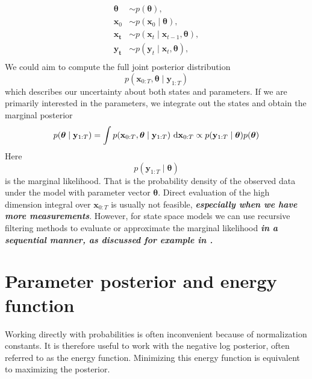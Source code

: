 \begin{align*}
    \boldsymbol{\theta} &\sim p(\boldsymbol{\theta}), \\
    \mathbf{x}_0 &\sim p(\mathbf{x}_0 \mid \boldsymbol{\theta}),\\
    \mathbf{x_t} &\sim p(\mathbf{x}_t \mid \mathbf{x}_{t-1}, \boldsymbol{\theta}),\\
    \mathbf{y_t} &\sim p(\mathbf{y}_t \mid \mathbf{x}_t, \boldsymbol{\theta}),\\
\end{align*}
We could aim to compute the full joint posterior distribution 
\[
p(\mathbf{x}_{0:T}, \boldsymbol{\theta} \mid \mathbf{y}_{1:T}) %
\]
which describes our uncertainty about both states and parameters. If we are primarily interested in the parameters, we integrate out the states and obtain the marginal posterior
\begin{equation}
    p(\boldsymbol{\theta} \mid \mathbf{y}_{1:T}) = \int p(\mathbf{x}_{0:T}, \boldsymbol{\theta} \mid \mathbf{y}_{1:T}) \text{ d\textbf{x}}_{0:T}
    \propto p(\mathbf{y}_{1:T} \mid \boldsymbol{\theta})p(\boldsymbol{\theta})
\end{equation}
Here \[p(\mathbf{y}_{1:T} \mid \boldsymbol{\theta})\] is the marginal likelihood. That is the probability density of the observed data under the model with parameter vector $\boldsymbol{\theta}$.
Direct evaluation of the high dimension integral over $\mathbf{x}_{0:T}$ is usually not feasible, \textbf{\textit{especially when we have more measurements}}. However, for state space models we can use recursive filtering methods to evaluate or approximate the marginal likelihood \textbf{\textit{in a sequential manner, as discussed for example in \cite{sarkka:bayesian_filtering}.}} %

\section{Parameter posterior and energy function}
Working directly with probabilities is often inconvenient because of normalization constants. It is therefore useful to work with the negative log posterior, often referred to as the energy function. Minimizing this energy function is equivalent to maximizing the posterior.


